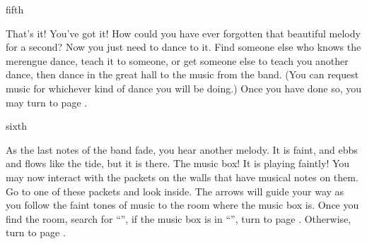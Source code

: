 \documentclass[greennotebook]{NeptuneBall}
\begin{document}
\begin{page}{fifth}

That's it! You've got it! How could you have ever forgotten that beautiful melody for a second? Now you just need to dance to it. Find someone else who knows the merengue dance, teach it to someone, or get someone else to teach you another dance, then dance in the great hall to the music from the band. (You can request music for whichever kind of dance you will be doing.) Once you have done so, you may turn to page .

\end{page}

\begin{page}{sixth}

As the last notes of the band fade, you hear another melody. It is faint, and ebbs and flows like the tide, but it is there. The music box! It is playing faintly! You may now interact with the packets on the walls that have musical notes on them. Go to one of these packets and look inside. The arrows will guide your way as you follow the faint tones of music to the room where the music box is. Once you find the room, search for ``\sPacketA{}'', if the music box is in ``\sPacketA{}'', turn to page . Otherwise, turn to page .

\end{page}

\endnotebook
\end{document}
